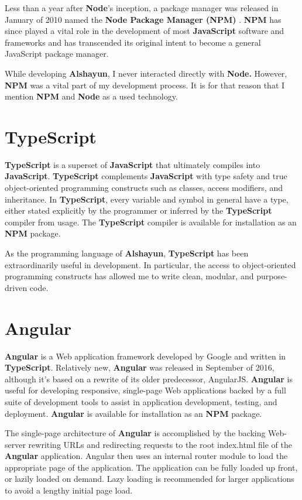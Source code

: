 \documentclass[12pt]{report}
\begin{document}
Less than a year after \textbf{Node}'s inception, a package manager was released
in January of 2010 named the \textbf{Node Package Manager (NPM)} \cite{npm}.
\textbf{NPM} has since played a vital role in the development of most
\textbf{JavaScript} software and frameworks and has transcended its original
intent to become a general JavaScript package manager.

While developing \textbf{Alshayun}, I never interacted directly with
\textbf{Node.} However, \textbf{NPM} was a vital part of my development process.
It is for that reason that I mention \textbf{NPM} and \textbf{Node} as a used
technology.

    \section{TypeScript}

\textbf{TypeScript} \cite{typescript} is a superset of \textbf{JavaScript} that
ultimately compiles into \textbf{JavaScript}. \textbf{TypeScript} complements
\textbf{JavaScript} with type safety and true object-oriented programming
constructs such as classes, access modifiers, and inheritance. In
\textbf{TypeScript}, every variable and symbol in general have a type, either
stated explicitly by the programmer or inferred by the \textbf{TypeScript}
compiler from usage. The \textbf{TypeScript} compiler is available for
installation as an \textbf{NPM} package.

As the programming language of \textbf{Alshayun}, \textbf{TypeScript} has been
extraordinarily useful in development. In particular, the access to
object-oriented programming constructs has allowed me to write clean, modular,
and purpose-driven code.

    \section{Angular}

\textbf{Angular} \cite{angular} is a Web application framework developed by
Google and written in \textbf{TypeScript}.  Relatively new, \textbf{Angular} was
released in September of 2016, although it's based on a rewrite of its older
predecessor, AngularJS. \textbf{Angular} is useful for developing responsive,
single-page Web applications backed by a full suite of development tools to
assist in application development, testing, and deployment. \textbf{Angular} is
available for installation as an \textbf{NPM} package.

The single-page architecture of \textbf{Angular} is accomplished by the backing
Web-server rewriting URLs and redirecting requests to the root index\@.html file
of the \textbf{Angular} application. Angular then uses an internal router module
to load the appropriate page of the application. The application can be fully
loaded up front, or lazily loaded on demand. Lazy loading is recommended for
larger applications to avoid a lengthy initial page load.
\end{document}
